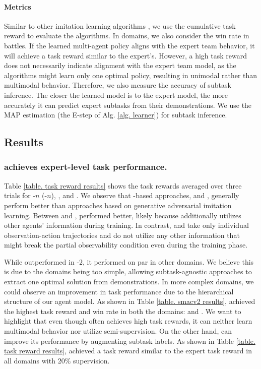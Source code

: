 \paragraph{Metrics} 
Similar to other imitation learning algorithms \cite{song2018multi, garg2021iq}, we use the cumulative task reward to evaluate the algorithms. In \smactwo domains, we also consider the win rate in battles. If the learned multi-agent policy aligns with the expert team behavior, it will achieve a task reward similar to the expert's. However, a high task reward does not necessarily indicate alignment with the expert team model, as the algorithms might learn only one optimal policy, resulting in unimodal rather than multimodal behavior. Therefore, we also measure the accuracy of subtask inference. The closer the learned model is to the expert model, the more accurately it can predict expert subtasks from their demonstrations. We use the MAP estimation (the E-step of Alg. \ref{alg. learner}) for subtask inference. 


\subsection{Results}
\label{sec. exp results}

\subsubsection{\ouralgsh achieves expert-level task performance.} 
Table \ref{table. task reward results} shows the task rewards averaged over three trials for \simplemulti-$n$ (\simplemultish-$n$), \movers, and \rescue. We observe that \iql-based approaches, \iiqlsh and \ouralgsh, generally perform better than approaches based on generative adversarial imitation learning. Between \magailsh and \maogailsh, \magailsh performed better, likely because \magailsh additionally utilizes other agents' information during training. In contrast, \maogailsh and \ouralgsh take only individual observation-action trajectories and do not utilize any other information that might break the partial observability condition even during the training phase.

While \ouralgsh outperformed \iiqlsh in \simplemulti-$2$, it performed on par in other domains. We believe this is due to the domains being too simple, allowing subtask-agnostic approaches to extract one optimal solution from demonstrations. In more complex domains, we could observe an improvement in task performance due to the hierarchical structure of our agent model. As shown in Table \ref{table. smacv2 results}, \ouralgsh achieved the highest task reward and win rate in both the \smactwo domains: \protoss and \terran. We want to highlight that even though \iiqlsh often achieves high task rewards, it can neither learn multimodal behavior nor utilize semi-supervision. On the other hand, \ouralgsh can improve its performance by augmenting subtask labels. As shown in Table \ref{table. task reward results}, \ouralgsh achieved a task reward similar to the expert task reward in all domains with 20\% supervision.

